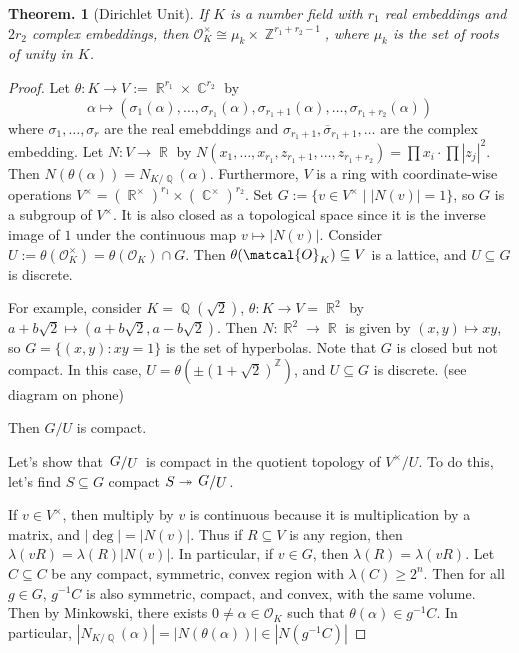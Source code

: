 \documentclass[11pt, a4paper]{memoir}
\DeclareMathOperator{\Q}{{\mathbb{Q}}}
\DeclareMathOperator{\Z}{{\mathbb{Z}}}
\DeclareMathOperator{\R}{{\mathbb{R}}}
\DeclareMathOperator{\C}{{\mathbb{C}}}
\newcommand{\abs}[1]{\ensuremath{\left\lvert#1\right\rvert}}
\newcommand{\ol}[1]{\ensuremath{\overline{#1}}}
\theoremstyle{change}
\newtheorem{theorem}{Theorem.}[section]
\theoremstyle{plain}
\theoremstyle{nonumberplain}
\newtheorem{proof}{Proof}
\newcommand{\quot}[2]{\mathchoice{\left.\raisebox{0.13em}{$#1$}\middle/\raisebox{-0.13em}{$#2$}\right.}
                                 {\left.\raisebox{0.07em}{$#1$}\middle/\raisebox{-0.07em}{$#2$}\right.}
                                 {\left.\raisebox{0.03em}{$#1$}\middle/\raisebox{-0.03em}{$#2$}\right.}
                                 {\left.\raisebox{0em}{$#1$}\middle/\raisebox{0em}{$#2$}\right.}}
\numberwithin{equation}{section}
\begin{document}
\begin{theorem}[Dirichlet Unit]\label{thm:dir-unit}
    If $K$ is a number field with $r_1$ real embeddings and $2r_2$ complex embeddings, then $\mathcal{O}_K^\times\cong\mu_k\times\Z^{r_1+r_2-1}$, where $\mu_k$ is the set of roots of unity in $K$.
\end{theorem}
\begin{proof}
    Let $\theta:K\to V:=\R^{r_1}\times\C^{r_2}$ by
    \begin{equation*}
        \alpha\mapsto(\sigma_1(\alpha),\ldots,\sigma_{r_1}(\alpha),\sigma_{r_1+1}(\alpha),\ldots,\sigma_{r_1+r_2}(\alpha))
    \end{equation*}
    where $\sigma_1,\ldots,\sigma_r$ are the real emebddings and $\sigma_{r_1+1},\ol{\sigma}_{r_1+1},\ldots$ are the complex embedding.
    Let $N:V\to\R$ by $N(x_1,\ldots,x_{r_1},z_{r_1+1},\ldots,z_{r_1+r_2})=\prod x_i\cdot\prod|z_j|^2$.
    Then $N(\theta(\alpha))=N_{K/\Q}(\alpha)$.
    Furthermore, $V$ is a ring with coordinate-wise operations $V^\times=(\R^\times)^{r_1}\times(\C^\times)^{r_2}$.
    Set $G:=\{v\in V^\times\mid|N(v)|=1\}$, so $G$ is a subgroup of $V^\times$.
    It is also closed as a topological space since it is the inverse image of $1$ under the continuous map $v\mapsto|N(v)|$.
    Consider $U:=\theta(\mathcal{O}_K^\times)=\theta(\mathcal{O}_K)\cap G$.
    Then $\theta(\matcal{O}_K)\subseteq V$ is a lattice, and $U\subseteq G$ is discrete.

    For example, consider $K=\Q(\sqrt{2})$, $\theta:K\to V=\R^2$ by $a+b\sqrt{2}\mapsto(a+b\sqrt{2},a-b\sqrt{2})$.
    Then $N:\R^2\to\R$ is given by $(x,y)\mapsto xy$, so $G=\{(x,y):xy=1\}$ is the set of hyperbolas.
    Note that $G$ is closed but not compact.
    In this case, $U=\theta(\pm(1+\sqrt{2})^{\Z})$, and $U\subseteq G$ is discrete.
    (see diagram on phone)
    \begin{center}
        \begin{tikzpicture}
        \end{tikzpicture}
    \end{center}
    Then $G/U$ is compact.

    Let's show that $\quot{G}{U}$ is compact in the quotient topology of $V^\times/U$.
    To do this, let's find $S\subseteq G$ compact $S\twoheadrightarrow\quot{G}{U}$.

    If $v\in V^\times$, then multiply by $v$ is continuous because it is multiplication by a matrix, and $|\deg|=|N(v)|$.
    Thus if $R\subseteq V$ is any region, then $\lambda(vR)=\lambda(R)|N(v)|$.
    In particular, if $v\in G$, then $\lambda(R)=\lambda(vR)$.
    Let $C\subseteq C$ be any compact, symmetric, convex region with $\lambda(C)\geq 2^n$.
    Then for all $g\in G$, $g^{-1}C$ is also symmetric, compact, and convex, with the same volume.
    Then by Minkowski, there exists $0\neq\alpha\in\mathcal{O}_K$ such that $\theta(\alpha)\in g^{-1}C$.
    In particular, $\abs{N_{K/\Q}(\alpha)}=\abs{N(\theta(\alpha))}\in\abs{N(g^{-1}C)}$


\end{proof}
\end{document}
